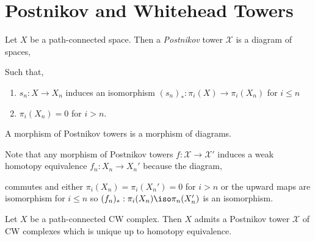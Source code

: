 \documentclass[12pt]{extarticle}
\begin{document}
\section{Postnikov and Whitehead Towers}

\newcommand{\X}{\mathcal{X}}

\begin{defn}
Let $X$ be a path-connected space. Then a \textit{Postnikov} tower $\X$ is a diagram of spaces,
\begin{center}
\end{center}
Such that,
\begin{enumerate}
\item $s_n : X \to X_n$ induces an isomorphism $(s_n)_* : \pi_i(X) \to \pi_i(X_n)$ for $i \le n$
\item $\pi_i(X_n) = 0$ for $i > n$. 
\end{enumerate}
A morphism of Postnikov towers is a morphism of diagrams. 
\end{defn}

\begin{rmk}
Note that any morphism of Postnikov towers $f : \X \to \X'$ induces a weak homotopy equivalence $f_n  : X_n \to X_n'$ because the diagram,
\begin{center}
\end{center}
commutes and either $\pi_i(X_n) = \pi_i(X_n') = 0$ for $i > n$ or the upward maps are isomorphism for $i \le n$ so $(f_n)_* : \pi_i(X_n) \iso \pi_n(X_n')$ is an isomorphism. 
\end{rmk}

\begin{prop}
Let $X$ be a path-connected CW complex. Then $X$ admits a Postnikov tower $\X$ of CW complexes which is unique up to homotopy equivalence. 
\end{prop}
\end{document}
